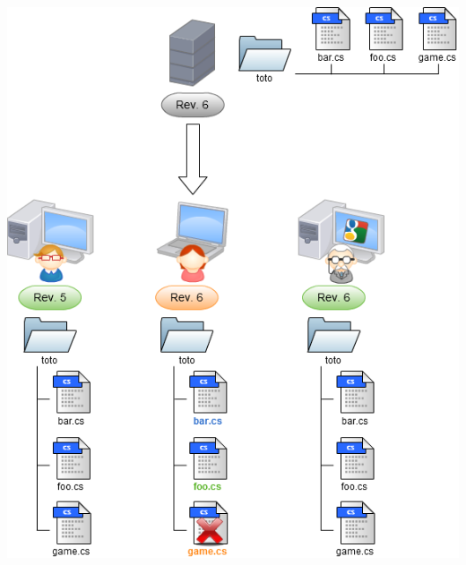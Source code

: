 \begin{frame}
  \begin{center}
    \includegraphics[scale=0.3]{images/9-Update_merge.png}
  \end{center}
\end{frame}

